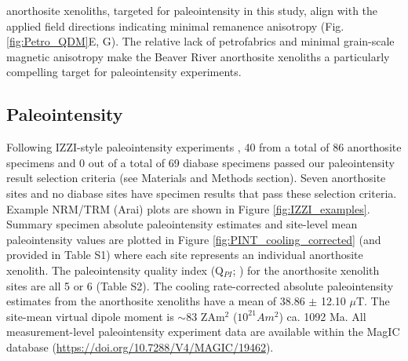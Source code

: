 anorthosite xenoliths, targeted for paleointensity in this study, align with the applied field directions indicating minimal remanence anisotropy  (Fig. \ref{fig:Petro_QDM}E, G). The relative lack of petrofabrics and minimal grain-scale magnetic anisotropy make the Beaver River anorthosite xenoliths a particularly compelling target for paleointensity experiments.

\subsection*{Paleointensity}

Following IZZI-style paleointensity experiments \citep{Yu2004a}, 40 from a total of 86 anorthosite specimens and 0 out of a total of 69 diabase specimens passed our paleointensity result selection criteria (see Materials and Methods section). Seven anorthosite sites and no diabase sites have specimen results that pass these selection criteria. Example NRM/TRM (Arai) plots are shown in Figure \ref{fig:IZZI_examples}. Summary specimen absolute paleointensity estimates and site-level mean paleointensity values are plotted in Figure \ref{fig:PINT_cooling_corrected} (and provided in Table S1) where each site represents an individual anorthosite xenolith. The paleointensity quality index (Q$_{PI}$; \citealp{Biggin2014a}) for the anorthosite xenolith sites are all 5 or 6 (Table S2). The cooling rate-corrected absolute paleointensity estimates from the anorthosite xenoliths have a mean of 38.86 $\pm$ 12.10 $\mu$T. The site-mean virtual dipole moment is $\sim$83 ZAm$^2$ ($10^{21} Am^2$) ca. 1092 Ma. All measurement-level paleointensity experiment data are available within the MagIC database (\url{https://doi.org/10.7288/V4/MAGIC/19462}). 

